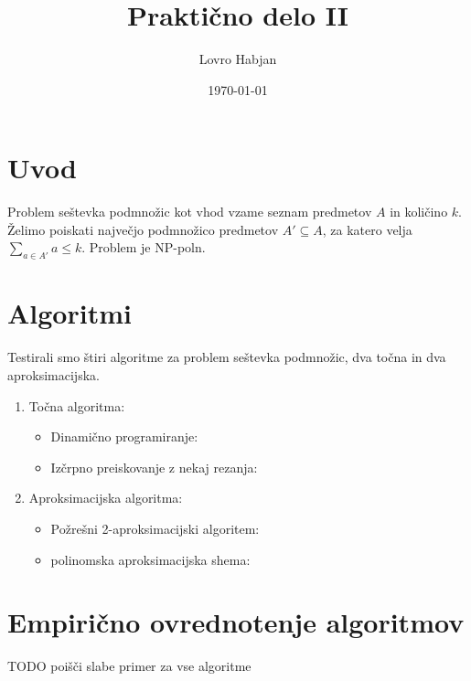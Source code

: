 \documentclass{article}
\title{Praktično delo II}
\author{Lovro Habjan}
\date{\today}
\begin{document}
\maketitle

\section{Uvod}

Problem seštevka podmnožic kot vhod vzame seznam predmetov $A$ in količino $k$. Želimo poiskati največjo podmnožico predmetov $A' \subseteq A$, za katero velja $\sum_{a \in A'} a \leq k$. Problem je NP-poln.

\section{Algoritmi}

Testirali smo štiri algoritme za problem seštevka podmnožic, dva točna in dva aproksimacijska.
\begin{enumerate}
	\item Točna algoritma:
	\begin{itemize}
		\item Dinamično programiranje:
		\item Izčrpno preiskovanje z nekaj rezanja:
	\end{itemize}

	\item Aproksimacijska algoritma:
	\begin{itemize}
		\item Požrešni 2-aproksimacijski algoritem:
		\item polinomska aproksimacijska shema:
	\end{itemize}
\end{enumerate}


\section{Empirično ovrednotenje algoritmov}

TODO poišči slabe primer za vse algoritme
\end{document}
